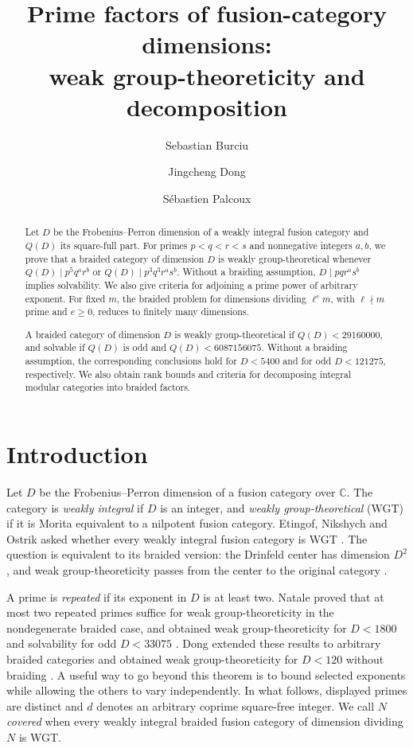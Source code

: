 \documentclass[11pt,a4paper]{article}
\title{Prime factors of fusion-category dimensions:\\ weak group-theoreticity and decomposition}
\author{Sebastian Burciu \and Jingcheng Dong \and S\'ebastien Palcoux}
\date{}
\numberwithin{equation}{section}
\theoremstyle{remark}
\newcommand{\CC}{\mathbb C}
\begin{document}
\maketitle


\begin{abstract}
Let $D$ be the Frobenius--Perron dimension of a weakly integral fusion category and $Q(D)$ its square-full part. For primes $p<q<r<s$ and nonnegative integers $a,b$, we prove that a braided category of dimension $D$ is weakly group-theoretical whenever $Q(D)\mid p^{5}q^{a}r^{b}$ or $Q(D)\mid p^{3}q^{3}r^{a}s^{b}$. Without a braiding assumption, $D\mid pqr^{a}s^{b}$ implies solvability. We also give criteria for adjoining a prime power of arbitrary exponent. For fixed $m$, the braided problem for dimensions dividing $\ell^{e}m$, with $\ell\nmid m$ prime and $e\ge 0$, reduces to finitely many dimensions.

A braided category of dimension $D$ is weakly group-theoretical if $Q(D)<29160000$, and solvable if $Q(D)$ is odd and $Q(D)<6087156075$. Without a braiding assumption, the corresponding conclusions hold for $D<5400$ and for odd $D<121275$, respectively. We also obtain rank bounds and criteria for decomposing integral modular categories into braided factors.
\end{abstract}
\section{Introduction}\label{fam:M:sec:1}
Let $D$ be the Frobenius--Perron dimension of a fusion category over $\CC$. The category is \emph{weakly integral} if $D$ is an integer, and \emph{weakly group-theoretical} (WGT) if it is Morita equivalent to a nilpotent fusion category. Etingof, Nikshych and Ostrik asked whether every weakly integral fusion category is WGT \cite[Section~11, Question~2]{ENOsolvable}. The question is equivalent to its braided version: the Drinfeld center has dimension $D^2$, and weak group-theoreticity passes from the center to the original category \cite[Proposition~4.1]{ENOsolvable}.

A prime is \emph{repeated} if its exponent in $D$ is at least two. Natale proved that at most two repeated primes suffice for weak group-theoreticity in the nondegenerate braided case, and obtained weak group-theoreticity for $D<1800$ and solvability for odd $D<33075$ \cite[Theorems~7.4, 8.1 and~8.2]{NataleWGT}. Dong extended these results to arbitrary braided categories and obtained weak group-theoreticity for $D<120$ without braiding \cite[Theorems~1.1--1.2, p.~556, and Corollaries~3.2--3.3]{DongWeakIntegral}. A useful way to go beyond this theorem is to bound selected exponents while allowing the others to vary independently. In what follows, displayed primes are distinct and $d$ denotes an arbitrary coprime square-free integer. We call $N$ \emph{covered} when every weakly integral braided fusion category of dimension dividing $N$ is WGT.
\end{document}
